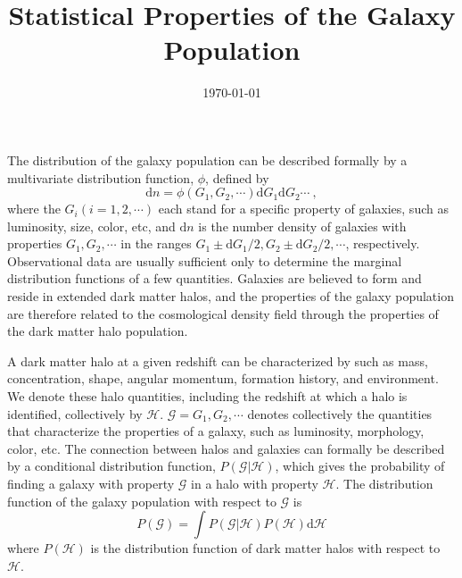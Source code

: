 \documentclass[12pt,a4paper]{article}
\title{Statistical Properties of the Galaxy Population}
\author{}
\date{\today}
\newcommand{\dif}{\mathrm{d}}
\begin{document}
\maketitle
\cite{2010gfe..book.....M} The distribution of the galaxy population can be described formally by a multivariate distribution function, $\phi$, defined by
\begin{equation}
\dif n = \phi(G_1, G_2, \cdots) \dif G_1 \dif G_2 \cdots ~,
\end{equation}
where the $G_i (i = 1, 2, \cdots)$ each stand for a specific property of galaxies, such as luminosity, size, color, etc, and $\dif n$ is the number density of galaxies with properties $G_1, G_2, \cdots$  in the ranges $G_1 \pm \dif G_1/2, G_2 \pm \dif G_2/2, \cdots$, respectively.  Observational data are usually sufficient only to determine the marginal distribution functions of a few quantities. Galaxies are believed to form and reside in extended dark matter halos, and the properties of the galaxy population are therefore related to the cosmological density field through the properties of the dark matter halo population.

A dark matter halo at a given redshift can be characterized by such as mass, concentration, shape, angular momentum, formation history, and environment. We denote these halo quantities, including the redshift at which a halo is identified, collectively by $\mathscr{H}$. $\mathscr{G} = {G_1,G_2, \cdots}$ denotes collectively the quantities that characterize the properties of a galaxy, such as luminosity, morphology, color, etc. The connection between halos and galaxies can formally be described by a
conditional distribution function, $P(\mathscr{G}|\mathscr{H})$, which gives the probability of finding a galaxy with property $\mathscr{G}$ in a halo with property $\mathscr{H}$. The distribution function of the galaxy population with respect to $\mathscr{G}$ is
\begin{equation}
P(\mathscr{G}) = \int P(\mathscr{G}|\mathscr{H}) P(\mathscr{H}) \dif \mathscr{H}
\end{equation}
where $P(\mathscr{H})$ is the distribution function of dark matter halos with respect to $\mathscr{H}$. 
\end{document}
